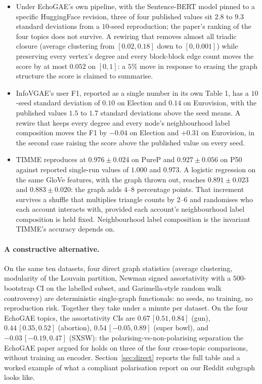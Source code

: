 \documentclass[letterpaper]{article} %
\begin{document}
\begin{itemize}
\item Under EchoGAE's own pipeline, with the Sentence-BERT
model pinned to a specific HuggingFace revision, three of four
published values sit $2.8$ to $9.3$ standard deviations from a
$10$-seed reproduction; the paper's ranking of the four topics
does not survive. A rewiring that removes almost all triadic
closure (average clustering from $[0.02, 0.18]$ down to
$[0, 0.001]$) while preserving every vertex's degree and every
block-block edge count moves the score by at most $0.052$ on
$[0, 1]$: a $5\%$ move in response to erasing the graph
structure the score is claimed to summarise.

\item InfoVGAE's user F1, reported as a single number in its
own Table 1, has a $10$-seed standard deviation of $0.10$ on
Election and $0.14$ on Eurovision, with the published values
$1.5$ to $1.7$ standard deviations above the seed means. A
rewire that keeps every degree and every node's neighbourhood
label composition moves the F1 by $-0.04$ on Election and
$+0.31$ on Eurovision, in the second case raising the score
above the published value on every seed.

\item TIMME reproduces at $0.976 \pm 0.024$ on PureP and
$0.927 \pm 0.056$ on P50 against reported single-run values of
$1.000$ and $0.973$. A logistic regression on the same GloVe
features, with the graph thrown out, reaches
$0.891 \pm 0.023$ and $0.883 \pm 0.020$: the graph adds
$4$--$8$ percentage points. That increment survives a shuffle
that multiplies triangle counts by $2$--$6$ and randomises who
each account interacts with, provided each account's
neighbourhood label composition is held fixed. Neighbourhood
label composition is the invariant TIMME's accuracy depends
on.
\end{itemize}

\paragraph{A constructive alternative.} On the same ten
datasets, four direct graph statistics (average clustering,
modularity of the Louvain partition, Newman signed
assortativity with a $500$-bootstrap CI on the labelled
subset, and Garimella-style random walk controversy) are
deterministic single-graph functionals: no seeds, no training,
no reproduction risk. Together they take under a minute per
dataset. On the four EchoGAE topics, the assortativity CIs
are $0.67\,[0.51, 0.84]$ (gun), $0.44\,[0.35, 0.52]$
(abortion), $0.54\,[-0.05, 0.89]$ (super bowl), and
$-0.03\,[-0.19, 0.47]$ (SXSW): the polarising-vs-non-polarising
separation the EchoGAE paper argued for holds on three of the
four cross-topic comparisons, without training an encoder.
Section~\ref{sec:direct} reports the full table and a worked
example of what a compliant polarisation report on our Reddit
subgraph looks like.
\end{document}
